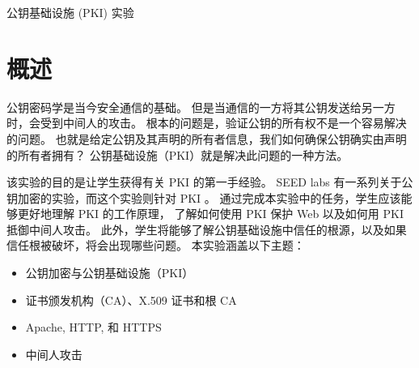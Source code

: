 
\newcommand{\commonfolder}{../../common-files}




\newcommand{\pkiFigs}{./Figs}

\newcommand{\OpenSSL} {\texttt{OpenSSL}\xspace}
\newcommand{\pkiserver}{\texttt{bank32.com}\xspace}





\begin{center}
{\LARGE 公钥基础设施 (PKI) 实验}
\end{center}




\section{概述}



公钥密码学是当今安全通信的基础。
但是当通信的一方将其公钥发送给另一方时，会受到中间人的攻击。
根本的问题是，验证公钥的所有权不是一个容易解决的问题。
也就是给定公钥及其声明的所有者信息，我们如何确保公钥确实由声明的所有者拥有？
公钥基础设施（PKI）就是解决此问题的一种方法。


该实验的目的是让学生获得有关 PKI 的第一手经验。
SEED labs 有一系列关于公钥加密的实验，而这个实验则针对 PKI 。
通过完成本实验中的任务，学生应该能够更好地理解 PKI 的工作原理，
了解如何使用 PKI 保护 Web 以及如何用 PKI 抵御中间人攻击。
此外，学生将能够了解公钥基础设施中信任的根源，以及如果信任根被破坏，将会出现哪些问题。
本实验涵盖以下主题：

\begin{itemize}[noitemsep]
   \item 公钥加密与公钥基础设施（PKI）
   \item 证书颁发机构（CA）、X.509 证书和根 CA
   \item Apache, HTTP, 和 HTTPS
   \item 中间人攻击
\end{itemize}



